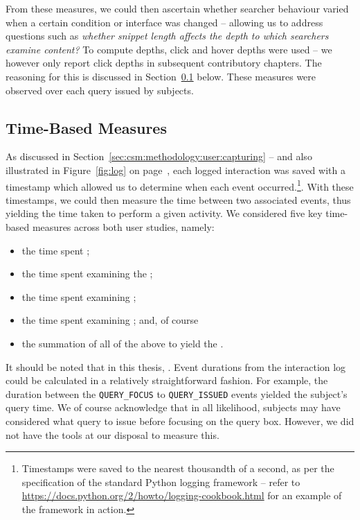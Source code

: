From these measures, we could then ascertain whether searcher behaviour varied when a certain condition or interface was changed -- allowing us to address questions such as \emph{whether snippet length affects the depth to which searchers examine content?} To compute depths, click and hover depths were used -- we however only report click depths in subsequent contributory chapters. The reasoning for this is discussed in Section~\ref{sec:csm:methodology:extracting:time} below. These measures were observed over each query issued by subjects.


\subsection{Time-Based Measures}\label{sec:csm:methodology:extracting:time}
As discussed in Section~\ref{sec:csm:methodology:user:capturing} -- and also illustrated in Figure~\ref{fig:log} on page~\pageref{fig:log}, each logged interaction was saved with a timestamp which allowed us to determine when each event occurred.\footnote{Timestamps were saved to the nearest thousandth of a second, as per the specification of the standard Python logging framework -- refer to \url{https://docs.python.org/2/howto/logging-cookbook.html}  for an example of the framework in action.}. With these timestamps, we could then measure the time between two associated events, thus yielding the time taken to perform a given activity. We considered five key time-based measures across both user studies, namely:

\begin{itemize}
    \item{the time spent ;}
    \item{the time spent examining the ;}
    \item{the time spent examining ;}
    \item{the time spent examining ; and, of course}
    \item{the summation of all of the above to yield the .}
\end{itemize}

It should be noted that in this thesis, . Event durations from the interaction log could be calculated in a relatively straightforward fashion. For example, the duration between the \texttt{QUERY\_FOCUS} to \texttt{QUERY\_ISSUED} events yielded the subject's query time. We of course acknowledge that in all likelihood, subjects may have considered what query to issue before focusing on the query box. However, we did not have the tools at our disposal to measure this. 

